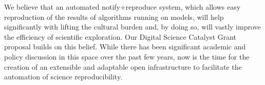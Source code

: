 \documentclass[a4paper,11pt]{article}
\begin{document}
We believe that an automated notify+reproduce system, which allows
easy reproduction of the results of algorithms running on models, will
help significantly with lifting the cultural burden and, by doing so,
will vastly improve the efficiency of scientific exploration. Our
Digital Science Catalyst Grant proposal builds on this belief. While
there has been significant academic and policy discussion in this
space over the past few years, now is the time for the creation of an
extensible and adaptable open infrastructure to facilitate the
automation of science reproducibility.




\end{document}
